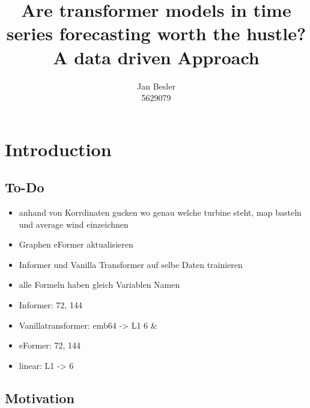 \documentclass{article}
\title{Are transformer models in time series forecasting worth the hustle? \\
        \Large A data driven Approach}
\author{Jan Besler \\
        5629079}
\begin{document}
\maketitle

\tableofcontents

\lstlistoflistings

\newpage

\section{Introduction}

\subsection{To-Do}

\begin{itemize}
   \item anhand von Korrdinaten gucken wo genau welche turbine steht, map basteln und average wind einzeichnen
   \item Graphen eFormer aktualisieren
   \item Informer und Vanilla Transformer auf selbe Daten trainieren
   \item alle Formeln haben gleich Variablen Namen
   \item Informer: 72, 144
   \item Vanillatransformer: emb64 -> L1 6 \& 
   \item eFormer: 72, 144
   \item linear: L1 -> 6
\end{itemize}

\subsection{Motivation}
\end{document}
